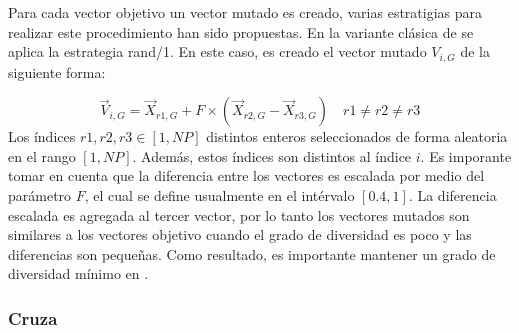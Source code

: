 Para cada vector objetivo un vector mutado es creado, varias estratigias para realizar este procedimiento han sido propuestas.
%
En la variante clásica de \DE{} se aplica la estrategia rand/1.
%
En este caso, es creado el vector mutado $V_{i,G}$ de la siguiente forma:

\begin{equation}\label{eqn:mutation}
\vec{V}_{i,G} = \vec{X}_{r1, G} + F \times (\vec{X}_{r2, G} - \vec{X}_{r3, G}) \quad r1 \neq r2 \neq r3
\end{equation}
%
Los índices $r1, r2, r3 \in [1,NP]$ distintos enteros seleccionados de forma aleatoria en el rango $[1, NP]$.
%
Además, estos índices son distintos al índice $i$.
%
Es imporante tomar en cuenta que la diferencia entre los vectores es escalada por medio del parámetro $F$, el cual se define usualmente en el intérvalo $[0.4, 1]$.
%
La diferencia escalada es agregada al tercer vector, por lo tanto los vectores mutados son similares a los vectores objetivo cuando el grado de diversidad es poco y las diferencias son pequeñas.
%
Como resultado, es importante mantener un grado de diversidad mínimo en \DE{}.

\subsubsection{Cruza}

